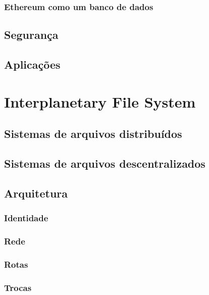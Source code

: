 \documentclass[tcc,capa]{texufpel}
\begin{document}
        \subsubsection{Ethereum como um banco de dados}

	\subsection{Segurança}
    
    \subsection{Aplicações}
    
\section{Interplanetary File System}

	\subsection{Sistemas de arquivos distribuídos}
    
    \subsection{Sistemas de arquivos descentralizados}

	\subsection{Arquitetura}
    
    	\subsubsection{Identidade}
        
        \subsubsection{Rede}
        
        \subsubsection{Rotas}
        
        \subsubsection{Trocas}
        
\end{document}

